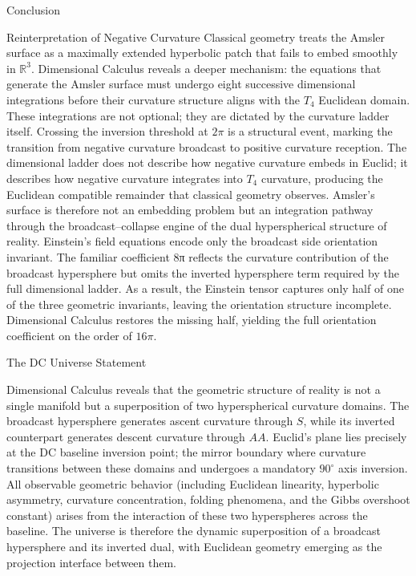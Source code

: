 \documentclass[final,onefignum,onetabnum]{siamart}
\begin{document}
\begin{section}{Conclusion}
\begin{subsection}{Reinterpretation of Negative Curvature}
Classical geometry treats the Amsler surface as a maximally extended hyperbolic patch that fails to embed smoothly in $\mathbb{R}^3.$ Dimensional Calculus reveals a deeper mechanism: the equations that generate the Amsler surface must undergo eight successive dimensional integrations before their curvature structure aligns with the $T_4$ Euclidean domain. These integrations are not optional; they are dictated by the curvature ladder itself. Crossing the inversion threshold at $2\pi$ is a structural event, marking the transition from negative curvature broadcast to positive curvature reception. The dimensional ladder does not describe how negative curvature embeds in Euclid; it describes how negative curvature integrates into $T_4$ curvature, producing the Euclidean compatible remainder that classical geometry observes. Amsler’s surface is therefore not an embedding problem but an integration pathway through the broadcast–collapse engine of the dual hyperspherical structure of reality.
Einstein’s field equations encode only the broadcast side orientation invariant. The familiar coefficient 8π reflects the curvature contribution of the broadcast hypersphere but omits the inverted hypersphere term required by the full dimensional ladder. As a result, the Einstein tensor captures only half of one of the three geometric invariants, leaving the orientation structure incomplete. Dimensional Calculus restores the missing half, yielding the full orientation coefficient on the order of $16\pi.$
\end{subsection}
\end{section}

\begin{section}{The DC Universe Statement}

Dimensional Calculus reveals that the geometric structure of reality is not a single manifold but a superposition of two hyperspherical curvature domains. The broadcast hypersphere generates ascent curvature through $S$, while its inverted counterpart generates descent curvature through $AA.$ Euclid’s plane lies precisely at the DC baseline inversion point; the mirror boundary where curvature transitions between these domains and undergoes a mandatory $90^\circ$ axis inversion. All observable geometric behavior (including Euclidean linearity, hyperbolic asymmetry, curvature concentration, folding phenomena, and the Gibbs overshoot constant) arises from the interaction of these two hyperspheres across the baseline. The universe is therefore the dynamic superposition of a broadcast hypersphere and its inverted dual, with Euclidean geometry emerging as the projection interface between them.
\end{section}
\end{document}
